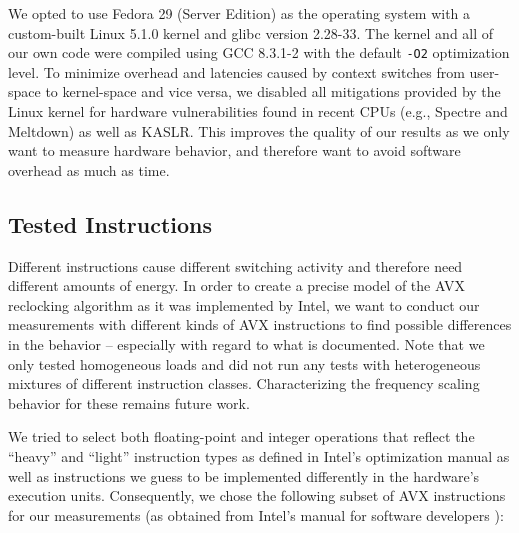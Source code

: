We opted to use Fedora 29 (Server Edition) as the operating system with a custom-built \gls{Linux} 5.1.0 kernel and glibc version 2.28-33. The kernel and all of our own code were compiled using GCC 8.3.1-2 with the default \texttt{-O2} optimization level. To minimize overhead and latencies caused by context switches from user-space to kernel-space and vice versa, we disabled all mitigations provided by the \gls{Linux} kernel for hardware vulnerabilities found in recent \glspl{CPU} (e.g., Spectre and Meltdown) as well as \gls{KASLR}. This improves the quality of our results as we only want to measure hardware behavior, and therefore want to avoid software overhead as much as time.

\subsection{Tested Instructions}
\label{sec:analysis:results:testedinstructions}

Different instructions cause different switching activity and therefore need different amounts of energy. In order to create a precise model of the \gls{AVX} reclocking algorithm as it was implemented by Intel, we want to conduct our measurements with different kinds of \gls{AVX} instructions to find possible differences in the behavior -- especially with regard to what is documented. Note that we only tested homogeneous loads and did not run any tests with heterogeneous mixtures of different instruction classes. Characterizing the frequency scaling behavior for these remains future work.

We tried to select both floating-point and integer operations that reflect the \enquote{heavy} and \enquote{light} instruction types as defined in Intel's optimization manual \cite{inteloptimizationmanual} as well as instructions we guess to be implemented differently in the hardware's execution units. Consequently, we chose the following subset of \gls{AVX} instructions for our measurements (as obtained from Intel's manual for software developers \cite{intelsdminstructionreference}):

